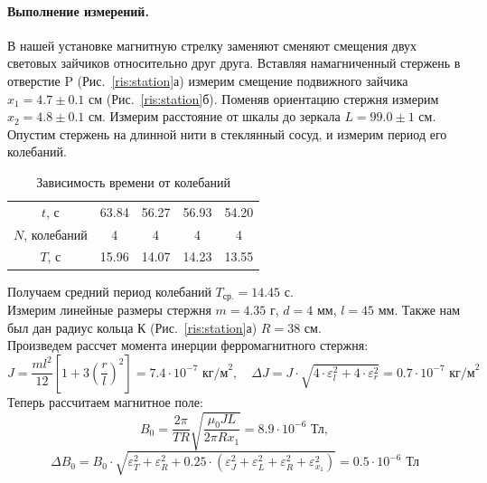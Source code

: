 \documentclass[a4paper, 12pt]{article}
\begin{document}
	\paragraph{Выполнение измерений.} В нашей установке магнитную стрелку заменяют сменяют смещения двух световых зайчиков относительно друг друга. Вставляя намагниченный стержень в отверстие P (Рис.~\ref{ris:station}а) измерим смещение подвижного зайчика $x_1=4.7\pm0.1$ см (Рис.~\ref{ris:station}б). Поменяв ориентацию стержня измерим $x_2=4.8\pm0.1$ см. Измерим расстояние от шкалы до зеркала $L=99.0\pm1$ см.\\
	Опустим стержень на длинной нити в стеклянный сосуд, и измерим период его колебаний.
	\begin{table}[H]
		\centering
		\caption{Зависимость времени от колебаний}
		\begin{tabular}{c|cccc}
			\toprule
			$t$, с & 63.84 &  56.27 & 56.93 & 54.20    \\
			$N$, колебаний & 4 & 4 & 4 &  4      \\ \midrule
			$T$, с & 15.96 & 14.07 & 14.23 & 13.55 \\ \bottomrule
		\end{tabular}
	\end{table}
	Получаем средний период колебаний $T_\text{ср.} = 14.45\text{ с}$.\\
	Измерим линейные размеры стержня $m = 4.35\text{ г}$, $d=4\text{ мм}$, $l=45\text{ мм}$. Также нам был дан радиус кольца К (Рис.~\ref{ris:station}а) $R=38\text{ см}$.\\ 
	Произведем рассчет момента инерции ферромагнитного стержня: $$J=\dfrac{ml^2}{12}\left[1+3\left(\dfrac{r}{l}\right)^2\right]=7.4 \cdot 10^{-7}\text{ кг/м}^2,\quad \Delta J= J\cdot\sqrt{4\cdot\varepsilon_l^2+4\cdot\varepsilon_r^2}=0.7\cdot 10^{-7}\text{ кг/м}^2$$ 
	Теперь рассчитаем магнитное поле: $$B_0=\dfrac{2\pi}{TR}\sqrt{\dfrac{\mu_0JL}{2\pi Rx_1}}=8.9\cdot 10^{-6} \text{ Тл},$$ $$ \Delta B_0=B_0\cdot\sqrt{\varepsilon_T^2+\varepsilon_R^2+0.25\cdot(\varepsilon_J^2+\varepsilon_L^2+\varepsilon_R^2+\varepsilon_{x_1}^2)}=0.5\cdot10^{-6}\text{ Тл}$$
	
\end{document}
